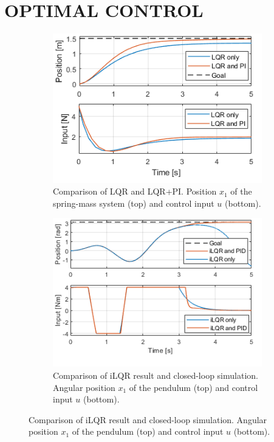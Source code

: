 \documentclass[letterpaper, 10 pt, conference]{ieeeconf}  %
\begin{document}
\section{OPTIMAL CONTROL}
\begin{figure}[!thp] 
	\centering
	\begin{subfigure}{0.325\textwidth}
		\includegraphics[width=\textwidth]{MS.png}
		\caption{Comparison of LQR and LQR+PI. Position $x_1$ of the spring-mass system (top) and control input $u$ (bottom).}\label{fig:JanSM}
	\end{subfigure}
	\begin{subfigure}{0.325\textwidth}
		\includegraphics[width=\textwidth]{P3.png}
		\caption{Comparison of iLQR result and closed-loop simulation. Angular position $x_1$ of the pendulum (top) and control input $u$ (bottom).}\label{fig:JanP1}

\end{subfigure}
\end{figure}
\end{document}
